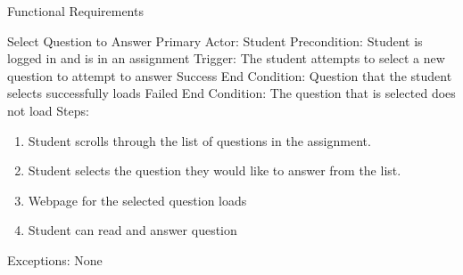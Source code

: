 \documentclass{article}
\begin{document}
\begin{section}{Functional Requirements}
    \begin{subsection}{Select Question to Answer}
    Primary Actor: Student \newline
    Precondition: Student is logged in and is in an assignment         \newline
    Trigger: The student attempts to select a new question      to attempt to answer \newline
    Success End Condition: Question that the student selects     successfully loads \newline
    Failed End Condition: The question that is selected does     not load \newline
    \newline
    Steps:
    \begin{enumerate}
    \item{Student scrolls through the list of questions in the assignment.}
    \item{Student selects the question they would like to        answer from the list.}
    \item{Webpage for the selected question loads}
    \item{Student can read and answer question}
    \end{enumerate}
    Exceptions: None
    \end{subsection}

\end{section}
\end{document}
